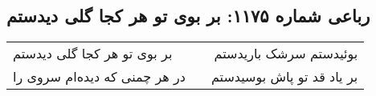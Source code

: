 \begin{center}
\section*{رباعی شماره ۱۱۷۵: بر بوی تو هر کجا گلی دیدستم}
\label{sec:1175}
\begin{longtable}{l p{0.5cm} r}
بر بوی تو هر کجا گلی دیدستم
&&
بوئیدستم سرشک باریدستم
\\
در هر چمنی که دیده‌ام سروی را
&&
بر یاد قد تو پاش بوسیدستم
\\
\end{longtable}
\end{center}
